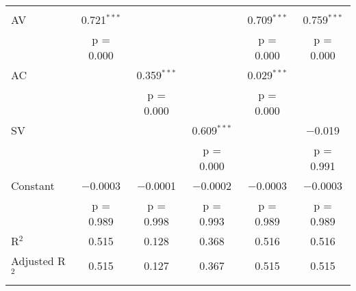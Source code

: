 
\begin{tabular}{@{\extracolsep{5pt}}lccccc} 
\\[-1.8ex]
\hline \\[-1.8ex] 
 AV & 0.721$^{***}$ &  &  & 0.709$^{***}$ & 0.759$^{***}$ \\ 
  & p = 0.000 &  &  & p = 0.000 & p = 0.000 \\ 
 AC &  & 0.359$^{***}$ &  & 0.029$^{***}$ &  \\ 
  &  & p = 0.000 &  & p = 0.000 &  \\ 
 SV &  &  & 0.609$^{***}$ &  & $-$0.019 \\ 
  &  &  & p = 0.000 &  & p = 0.991 \\ 
 Constant & $-$0.0003 & $-$0.0001 & $-$0.0002 & $-$0.0003 & $-$0.0003 \\ 
  & p = 0.989 & p = 0.998 & p = 0.993 & p = 0.989 & p = 0.989 \\ 
R$^{2}$ & 0.515 & 0.128 & 0.368 & 0.516 & 0.516 \\ 
Adjusted R$^{2}$ & 0.515 & 0.127 & 0.367 & 0.515 & 0.515 \\ 
\hline \\[-1.8ex] 
\end{tabular} 
